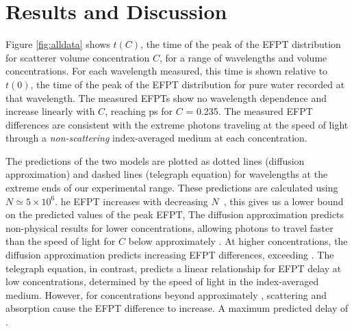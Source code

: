 \section{Results and Discussion}

Figure \ref{fig:alldata} shows $t(C)$, the time of the peak of the EFPT distribution for scatterer volume concentration $C$, for a range of wavelengths and volume concentrations. For each wavelength measured, this time is shown relative to $t(0)$, the time of the peak of the EFPT distribution for pure water recorded at that wavelength. The measured EFPTs show no wavelength dependence and increase linearly with $C$, reaching  ps for $C$ = 0.235. The measured EFPT differences are consistent with the extreme photons traveling at the speed of light through a \textit{non-scattering} index-averaged medium at each concentration. 

The predictions of the two models are plotted as dotted lines (diffusion approximation) and dashed lines (telegraph equation) for wavelengths at the extreme ends of our experimental range. These predictions are calculated using $N \simeq 5 \times 10^{6}$. he EFPT increases with decreasing $N$~\cite{lawley_distribution_2020}, this  gives us a lower bound on the predicted values of the peak EFPT,  The diffusion approximation predicts non-physical results for lower concentrations, allowing photons to travel faster than the speed of light for $C$ below approximately . At higher concentrations, the diffusion approximation predicts increasing EFPT differences, exceeding .  The telegraph equation, in contrast, predicts a linear relationship for EFPT delay at low concentrations, determined by the speed of light in the index-averaged medium. However, for concentrations beyond approximately , scattering and absorption cause the EFPT difference to increase. A maximum predicted delay of .


